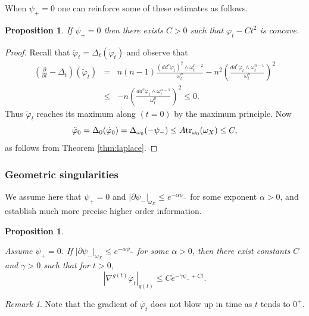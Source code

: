 \documentclass[a4paper,11pt,leqno,english]{smfart}
\theoremstyle{plain}
\theoremstyle{plain}
\numberwithin{equation}{section} %
\numberwithin{figure}{section} %
\theoremstyle{plain}
\newtheorem{prop}[thm]{Proposition} %
\theoremstyle{plain}
\theoremstyle{remark}
\theoremstyle{remark}
\newtheorem{rem}[thm]{Remark}
\theoremstyle{definition}
\theoremstyle{plain}
\theoremstyle{plain}
\theoremstyle{definition}
\newcommand{\f}{\varphi}
\newcommand{\p}{\psi}
\begin{document}
  
 When $\p_+=0$ one can reinforce some of these estimates as follows.
 

\begin{prop} \label{pro:quasiconcave}
If  $\p_+=0$  then there exists $C>0$ such that $\f_t-Ct^2$ is concave.
\end{prop}

\begin{proof}
Recall that $\ddot{\f}_t=\Delta_t (\dot{\f}_t)$ and observe that
\begin{eqnarray*}
\left( \frac{\partial}{\partial t}-\Delta_t \right)(\ddot{\f}_t)
&=& n(n-1) \frac{(dd^c \dot{\f}_t)^2 \wedge \omega_t^{n-2}}{\omega_t^n}
-n^2 \left(\frac{dd^c \dot{\f}_t \wedge \omega_t^{n-1}}{\omega_t^n} \right)^2 \\
&\leq & -n \left(\frac{dd^c \dot{\f}_t \wedge \omega_t^{n-1}}{\omega_t^n} \right)^2 \leq 0.
\end{eqnarray*}
Thus $\ddot{\f}_t$ reaches its maximum along $(t=0)$ by the maximum principle. Now
$$
\ddot{\f}_0=\Delta_0 (\dot{\f}_0)=\Delta_{\omega_0} (-\p_-) \leq A {\rm tr}_{\omega_0}(\omega_X) \leq C,
$$
as follows from Theorem \ref{thm:laplace}.
\end{proof}





\subsubsection{Geometric singularities} \label{sec:alix}

We assume here that $\p_+=0$ and $|\partial \p_-|_{\omega_X} \leq e^{-\alpha \p_-}$
for some exponent $\alpha>0$, and establish  much more precise higher order information.
 
 \begin{prop}\label{pro:alix1}

Assume $\psi_+=0$. If $|\partial\psi_{-}|_{\omega_X}\leq e^{-\alpha\psi_{-}}$ for some $\alpha> 0$,  then there exist constants $C$ and $\gamma>0$ such that for $t>0$,
\begin{equation*}
|\nabla^{g(t)}\dot{\f_t}|_{g(t)}\leq Ce^{-\gamma\psi_{-}+Ct}.
\end{equation*}
\end{prop}

\begin{rem}
Note that the gradient of $\dot{\f_t}$ does not blow up in time as $t$ tends to $0^+$.
\end{rem}
\end{document}
